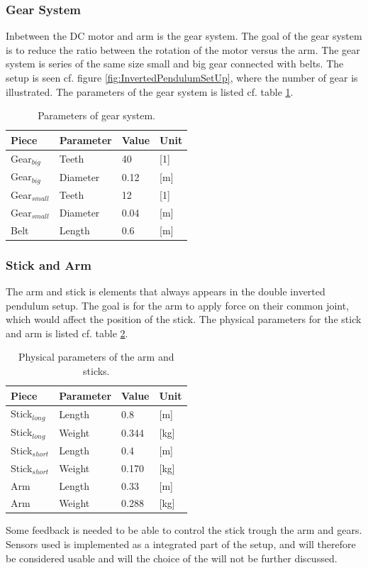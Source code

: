 	

\subsubsection{Gear System}
Inbetween the DC motor and arm is the gear system. The goal of the gear system is to reduce the ratio between the rotation of the motor versus the arm. The gear system is series of the same size small and big gear connected with belts. The setup is seen cf. figure \ref{fig:InvertedPendulumSetUp}, where the number of gear is illustrated. The parameters of the gear system is listed cf. table \ref{GearSystemParameters}.   

\begin{table}[htbp]
\centering
\begin{tabular}{llll}
\hline
Piece & Parameter & Value & Unit \\ \hline
Gear$_{big}$ & Teeth & 40 & {[}1{]} \\
Gear$_{big}$ & Diameter & 0.12 & {[}m{]} \\
Gear$_{small}$ & Teeth & 12 & {[}1{]} \\
Gear$_{small}$ & Diameter & 0.04 & {[}m{]} \\
Belt & Length & 0.6 & {[}m{]}
\end{tabular}
\caption{Parameters of gear system.}
\label{GearSystemParameters}
\end{table}

\subsubsection{Stick and Arm}
The arm and stick is elements that always appears in the double inverted pendulum setup. The goal is for the arm to apply force on their common joint, which would affect the position of the stick. The physical parameters for the stick and arm is listed cf. table \ref{DimensionsStick}.

\begin{table}[htbp]
\centering
\begin{tabular}{llll}
\hline
Piece           & Parameter & Value & Unit \\ \hline
Stick$_{long}$  & Length    & 0.8   & [m]    \\
Stick$_{long}$  & Weight    & 0.344 & [kg]    \\ 
Stick$_{short}$ & Length    & 0.4   & [m]    \\
Stick$_{short}$ & Weight    & 0.170 & [kg]    \\ 
Arm             & Length    & 0.33  & [m]    \\
Arm             & Weight    & 0.288   & [kg]   \\ 
\end{tabular}
\caption{Physical parameters of the arm and sticks.}
\label{DimensionsStick}
\end{table}
\newpage
Some feedback is needed to be able to control the stick trough the arm and gears. Sensors used is implemented as a integrated part of the setup, and will therefore be considered usable and will the choice of the will not be further discussed.

